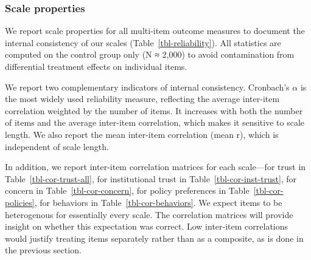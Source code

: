 \documentclass[
  letterpaper,
  DIV=11,
  numbers=noendperiod]{scrartcl}
\begin{document}
\subsubsection{Scale properties}\label{scale-properties}

We report scale properties for all multi-item outcome measures to
document the internal consistency of our scales
(Table~\ref{tbl-reliability}). All statistics are computed on the
control group only (N ≈ 2,000) to avoid contamination from differential
treatment effects on individual items.

We report two complementary indicators of internal consistency.
Cronbach's \(\alpha\) is the most widely used reliability measure,
reflecting the average inter-item correlation weighted by the number of
items. It increases with both the number of items and the average
inter-item correlation, which makes it sensitive to scale length. We
also report the mean inter-item correlation (mean r), which is
independent of scale length.

In addition, we report inter-item correlation matrices for each
scale---for trust in Table~\ref{tbl-cor-trust-all}, for institutional
trust in Table~\ref{tbl-cor-inst-trust}, for concern in
Table~\ref{tbl-cor-concern}, for policy preferences in
Table~\ref{tbl-cor-policies}, for behaviors in
Table~\ref{tbl-cor-behaviors}. We expect items to be heterogenous for
essentially every scale. The correlation matrices will provide insight
on whether this expectation was correct. Low inter-item correlations
would justify treating items separately rather than as a composite, as
is done in the previous section.
\end{document}
